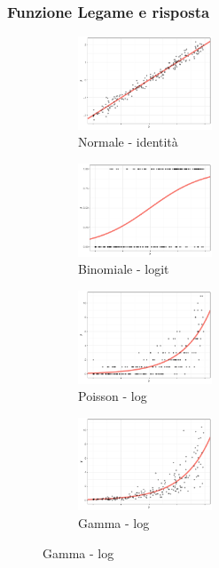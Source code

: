 \documentclass[pdf, aspectratio=169]{beamer}\usepackage[]{graphicx}\usepackage[]{color}
\theoremstyle{definition}
\begin{document}
\begin{frame}
\frametitle{Funzione Legame e risposta}

\fontsize{9pt}{11pt}\selectfont

\begin{figure}
  \centering
  \begin{subfigure}[b]{4.8cm}
    \centering
    \caption{Normale - identità}
    \includegraphics[width=4cm]{_bookdown_files/_main_files/figure-latex/resp-var-1.pdf}
  \end{subfigure}
  \qquad
  \begin{subfigure}[b]{4.8cm}
    \centering
    \caption{Binomiale - logit}
    \includegraphics[width=4cm]{_bookdown_files/_main_files/figure-latex/resp-var-2.pdf}
  \end{subfigure}
  \par\medskip
  \begin{subfigure}[b]{4.8cm}
    \centering
    \caption{Poisson - log}
    \includegraphics[width=4cm]{_bookdown_files/_main_files/figure-latex/resp-var-3.pdf}
  \end{subfigure}
  \qquad
  \begin{subfigure}[b]{4.8cm}
    \centering
    \caption{Gamma - log}
    \includegraphics[width=4cm]{_bookdown_files/_main_files/figure-latex/resp-var-4.pdf}
  \end{subfigure}
\end{figure}

\end{frame}
\end{document}
